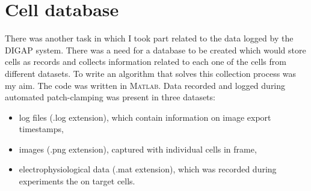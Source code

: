 \documentclass[12pt,a4paper]{report}
\begin{document}
\section{Cell database}
There was another task in which I took part related to the data logged by the DIGAP system. There was a need for a database to be created which would store cells as records and collects information related to each one of the cells from different datasets. To write an algorithm that solves this collection process was my aim. The code was written in \textsc{Matlab}. Data recorded and logged during automated patch-clamping was present in three datasets:
\begin{itemize}
    \item log files (.log extension), which contain information on image export timestamps,
    \item images (.png extension), captured with individual cells in frame,
    \item electrophysiological data (.mat extension), which was recorded during experiments the on target cells.
\end{itemize}
\end{document}

